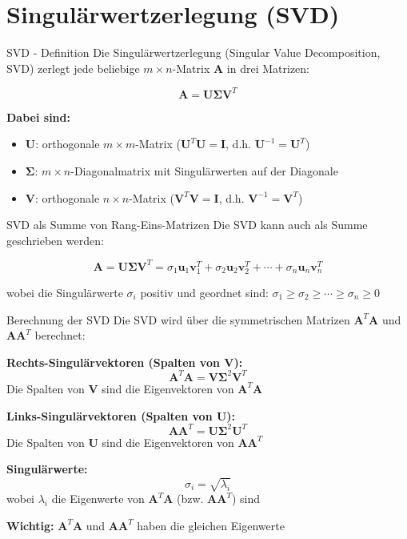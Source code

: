 \documentclass[a4paper, fontsize=7pt]{scrartcl}
\begin{document}
\section{Singulärwertzerlegung (SVD)}

\begin{mainbox}{SVD - Definition}
Die Singulärwertzerlegung (Singular Value Decomposition, SVD) zerlegt jede beliebige $m \times n$-Matrix $\mathbf{A}$ in drei Matrizen:

$$\mathbf{A} = \mathbf{U\Sigma V}^T$$

\textbf{Dabei sind:}
\begin{itemize}
    \item $\mathbf{U}$: orthogonale $m \times m$-Matrix ($\mathbf{U}^T\mathbf{U} = \mathbf{I}$, d.h. $\mathbf{U}^{-1} = \mathbf{U}^T$)
    \item $\mathbf{\Sigma}$: $m \times n$-Diagonalmatrix mit Singulärwerten auf der Diagonale
    \item $\mathbf{V}$: orthogonale $n \times n$-Matrix ($\mathbf{V}^T\mathbf{V} = \mathbf{I}$, d.h. $\mathbf{V}^{-1} = \mathbf{V}^T$)
\end{itemize}
\end{mainbox}

\begin{mainbox}{SVD als Summe von Rang-Eins-Matrizen}
Die SVD kann auch als Summe geschrieben werden:

$$\mathbf{A} = \mathbf{U\Sigma V}^T = \sigma_1\mathbf{u}_1\mathbf{v}_1^T + \sigma_2\mathbf{u}_2\mathbf{v}_2^T + \cdots + \sigma_n\mathbf{u}_n\mathbf{v}_n^T$$

wobei die Singulärwerte $\sigma_i$ positiv und geordnet sind: $\sigma_1 \geq \sigma_2 \geq \cdots \geq \sigma_n \geq 0$
\end{mainbox}

\begin{mainbox}{Berechnung der SVD}
Die SVD wird über die symmetrischen Matrizen $\mathbf{A}^T\mathbf{A}$ und $\mathbf{AA}^T$ berechnet:

\textbf{Rechts-Singulärvektoren (Spalten von $\mathbf{V}$):}
$$\mathbf{A}^T\mathbf{A} = \mathbf{V\Sigma}^2\mathbf{V}^T$$
Die Spalten von $\mathbf{V}$ sind die Eigenvektoren von $\mathbf{A}^T\mathbf{A}$

\textbf{Links-Singulärvektoren (Spalten von $\mathbf{U}$):}
$$\mathbf{AA}^T = \mathbf{U\Sigma}^2\mathbf{U}^T$$
Die Spalten von $\mathbf{U}$ sind die Eigenvektoren von $\mathbf{AA}^T$

\textbf{Singulärwerte:}
$$\sigma_i = \sqrt{\lambda_i}$$
wobei $\lambda_i$ die Eigenwerte von $\mathbf{A}^T\mathbf{A}$ (bzw. $\mathbf{AA}^T$) sind

\textbf{Wichtig:} $\mathbf{A}^T\mathbf{A}$ und $\mathbf{AA}^T$ haben die gleichen Eigenwerte
\end{mainbox}
\end{document}
